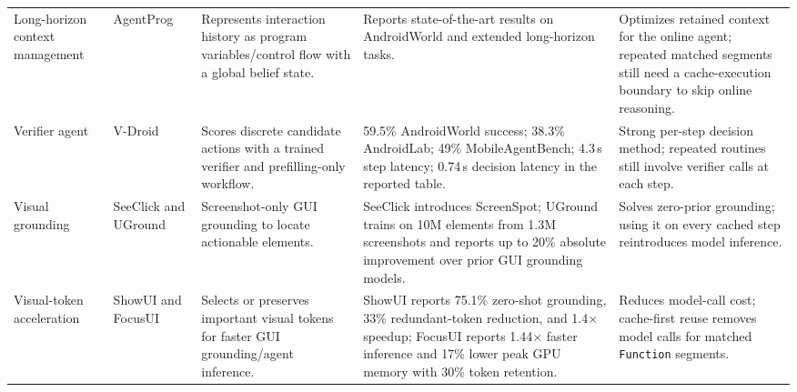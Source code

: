 \documentclass[sigplan,10pt]{acmart}
\begin{document}
\begin{table}[t]
\begin{tabularx}{\textwidth}{@{}p{}p{}X X X@{}}
\addlinespace
Long-horizon context management & AgentProg~\cite{tian2025agentprog} & Represents interaction history as program variables/control flow with a global belief state. & Reports state-of-the-art results on AndroidWorld and extended long-horizon tasks. & Optimizes retained context for the online agent; repeated matched segments still need a cache-execution boundary to skip online reasoning. \\
\addlinespace
Verifier agent & V-Droid~\cite{dai2025advancing} & Scores discrete candidate actions with a trained verifier and prefilling-only workflow. & 59.5\% AndroidWorld success; 38.3\% AndroidLab; 49\% MobileAgentBench; 4.3\,s step latency; 0.74\,s decision latency in the reported table. & Strong per-step decision method; repeated routines still involve verifier calls at each step. \\
\addlinespace
Visual grounding & SeeClick and UGround~\cite{cheng2024seeclick,gou2024uground} & Screenshot-only GUI grounding to locate actionable elements. & SeeClick introduces ScreenSpot; UGround trains on 10M elements from 1.3M screenshots and reports up to 20\% absolute improvement over prior GUI grounding models. & Solves zero-prior grounding; using it on every cached step reintroduces model inference. \\
\addlinespace
Visual-token acceleration & ShowUI and FocusUI~\cite{lin2025showui,ouyang2026focusui} & Selects or preserves important visual tokens for faster GUI grounding/agent inference. & ShowUI reports 75.1\% zero-shot grounding, 33\% redundant-token reduction, and 1.4$\times$ speedup; FocusUI reports 1.44$\times$ faster inference and 17\% lower peak GPU memory with 30\% token retention. & Reduces model-call cost; cache-first reuse removes model calls for matched \texttt{Function} segments. \\
\bottomrule
\end{tabularx}
\end{table}




\end{document}
